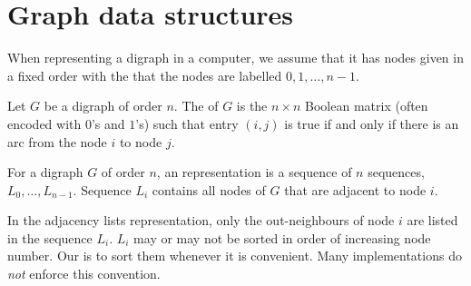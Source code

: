 %
%
%
%




 

\chapter{Graph data structures} \label{sec:graph-reps}

When representing a digraph in a computer, we assume
that it has nodes given in a fixed order with the
 that the nodes are labelled $0, 1, \dots, n - 1$.

\begin{Definition}
Let $G$ be a digraph of order $n$. The  of $G$
is the $n\times n$ Boolean matrix (often encoded with $0$'s and $1$'s)
such that entry $(i, j)$ is true if and only if there is an arc from the
node $i$ to node $j$.
\end{Definition}

\begin{Definition}
For a digraph $G$ of order $n$, an 
representation is a sequence of $n$ sequences, $L_0, \dots, L_{n-1}$. 
Sequence $L_i$ contains all nodes of $G$ that are adjacent to node $i$.
\end{Definition}

In the adjacency lists representation, only the out-neighbours of node $i$ are listed in the sequence $L_i$. 
$L_i$ may or may not be sorted in order of increasing node number. 
Our  is to sort them whenever it is convenient. 
Many implementations do \emph{not} enforce this convention.

